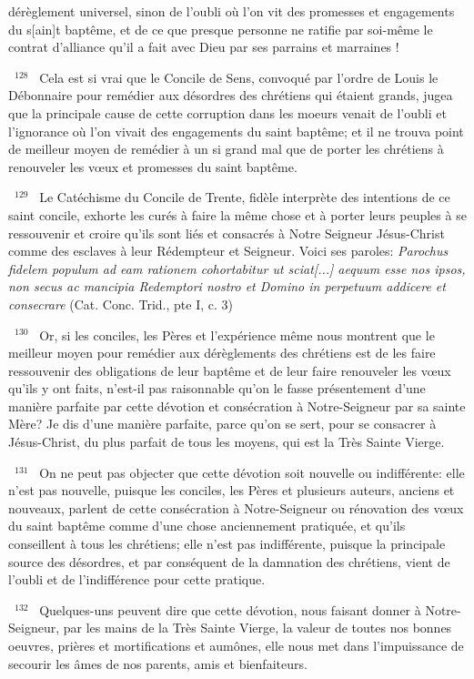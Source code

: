 \documentclass[paper=a5,pagesize=pdftex,fontsize=15pt,headinclude=on,twoside=off]{scrbook}
\newcommand{\negphantom}[1]{\settowidth{\dimen0}{#1}\hspace*{-\dimen0}}
\newcommand{\versenb}[1]{\par \vspace{10pt}~\negphantom{~${}^{#1}$~}${}^{#1}$~}
\newcommand{\latin}[1]{\emph{#1}}
\begin{document}
dérèglement universel, sinon de l'oubli où l'on vit des promesses et engagements du s[ain]t baptême, et de ce que
presque personne ne ratifie par soi-même le contrat d'alliance qu'il a fait avec Dieu par ses parrains et marraines !
\versenb{128} Cela est si vrai que le Concile de Sens, convoqué par l'ordre de Louis le Débonnaire pour remédier aux
désordres des chrétiens qui étaient grands, jugea que la principale cause de cette corruption dans les moeurs
venait de l'oubli et l'ignorance où l'on vivait des engagements du saint baptême; et il ne trouva point de meilleur
moyen de remédier à un si grand mal que de porter les chrétiens à renouveler les vœux et promesses du saint
baptême.
\versenb{129} Le Catéchisme du Concile de Trente, fidèle interprète des intentions de ce saint concile, exhorte les curés à
faire la même chose et à porter leurs peuples à se ressouvenir et croire qu'ils sont liés et consacrés à Notre Seigneur Jésus-Christ comme des esclaves à leur Rédempteur et Seigneur. Voici ses paroles: \latin{Parochus fidelem
populum ad eam rationem cohortabitur ut sciat[...] aequum esse nos ipsos, non secus ac mancipia Redemptori
nostro et Domino in perpetuum addicere et consecrare} (Cat. Conc. Trid., pte I, c. 3)
\versenb{130} Or, si les conciles, les Pères et l'expérience même nous montrent que le meilleur moyen pour remédier aux
dérèglements des chrétiens est de les faire ressouvenir des obligations de leur baptême et de leur faire renouveler
les vœux qu'ils y ont faits, n'est-il pas raisonnable qu'on le fasse présentement d'une manière parfaite par cette
dévotion et consécration à Notre-Seigneur par sa sainte Mère? Je dis d'une manière parfaite, parce qu'on se sert,
pour se consacrer à Jésus-Christ, du plus parfait de tous les moyens, qui est la Très Sainte Vierge.
\versenb{131} On ne peut pas objecter que cette dévotion soit nouvelle ou indifférente: elle n'est pas nouvelle, puisque les
conciles, les Pères et plusieurs auteurs, anciens et nouveaux, parlent de cette consécration à Notre-Seigneur ou
rénovation des vœux du saint baptême comme d'une chose anciennement pratiquée, et qu'ils conseillent à tous
les chrétiens; elle n'est pas indifférente, puisque la principale source des désordres, et par conséquent de la
damnation des chrétiens, vient de l'oubli et de l'indifférence pour cette pratique.
\versenb{132} Quelques-uns peuvent dire que cette dévotion, nous faisant donner à Notre-Seigneur, par les mains de la
Très Sainte Vierge, la valeur de toutes nos bonnes oeuvres, prières et mortifications et aumônes, elle nous met
dans l'impuissance de secourir les âmes de nos parents, amis et bienfaiteurs.
\end{document}
